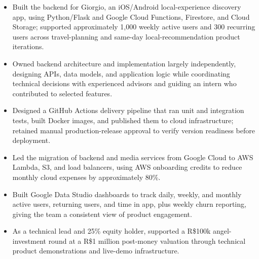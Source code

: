 \begin{itemize}
  \item Built the backend for Giorgio, an iOS/Android local-experience discovery app, using Python/Flask and Google Cloud Functions, Firestore, and Cloud Storage; supported approximately 1,000 weekly active users and 300 recurring users across travel-planning and same-day local-recommendation product iterations.
  \item Owned backend architecture and implementation largely independently, designing APIs, data models, and application logic while coordinating technical decisions with experienced advisors and guiding an intern who contributed to selected features.
  \item Designed a GitHub Actions delivery pipeline that ran unit and integration tests, built Docker images, and published them to cloud infrastructure; retained manual production-release approval to verify version readiness before deployment.
  \item Led the migration of backend and media services from Google Cloud to AWS Lambda, S3, and load balancers, using AWS onboarding credits to reduce monthly cloud expenses by approximately 80\%.
  \item Built Google Data Studio dashboards to track daily, weekly, and monthly active users, returning users, and time in app, plus weekly churn reporting, giving the team a consistent view of product engagement.
  \item As a technical lead and 25\% equity holder, supported a R\$100k angel-investment round at a R\$1 million post-money valuation through technical product demonstrations and live-demo infrastructure.
\end{itemize}
